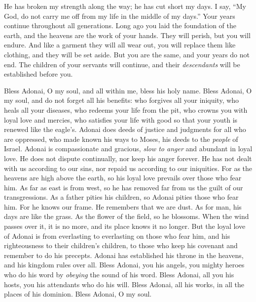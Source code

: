 \begin{biblechapter}
\verse He has broken my strength along the way; 
he has cut short my days.
\verse I say, “My God, do not carry me off 
from my life in the middle of my days.” 
Your years continue throughout all generations.
\verse Long ago you laid the foundation of the earth, 
and the heavens are the work of your hands.
\verse They will perish, but you will endure. 
And like a garment they will all wear out, 
you will replace them like clothing, and they will be set aside.
\verse But you are the same, 
and your years do not end.
\verse The children of your servants will continue, 
and their \textit{descendants} will be established before you.
\end{biblechapter}

\begin{biblechapter} %
 Bless Adonai, O my soul, 
and all within me, bless his holy name.
\verse Bless Adonai, O my soul, 
and do not forget all his benefits:
\verse who forgives all your iniquity, 
who heals all your diseases,
\verse who redeems your life from the pit, 
who crowns you with loyal love and mercies,
\verse who satisfies your life with good 
so that your youth is renewed like the eagle’s.
\verse Adonai does deeds of justice 
and judgments for all who are oppressed,
\verse who made known his ways to Moses, 
his deeds to the \textit{people} of Israel.
\verse Adonai is compassionate and gracious, 
\textit{slow to anger} and abundant in loyal love.
\verse He does not dispute continually, 
nor keep his anger forever.
\verse He has not dealt with us according to our sins, 
nor repaid us according to our iniquities.
\verse For as the heavens are high above the earth, 
so his loyal love prevails over those who fear him.
\verse As far as east is from west, 
so he has removed far from us the guilt of our transgressions.
\verse As a father pities his children, 
so Adonai pities those who fear him.
\verse For he knows our frame. 
He remembers that we are dust.
\verse As for man, his days are like the grass. 
As the flower of the field, so he blossoms.
\verse When the wind passes over it, it is no more, 
and its place knows it no longer.
\verse But the loyal love of Adonai 
is from everlasting to everlasting on those who fear him, 
and his righteousness to their children’s children,
\verse to those who keep his covenant 
and remember to do his precepts.
\verse Adonai has established his throne in the heavens, 
and his kingdom rules over all.
\verse Bless Adonai, you his angels, 
you mighty heroes who do his word 
by \textit{obeying} the sound of his word.
\verse Bless Adonai, all you his hosts, 
you his attendants who do his will.
\verse Bless Adonai, all his works, 
in all the places of his dominion. 
Bless Adonai, O my soul.
\end{biblechapter}


